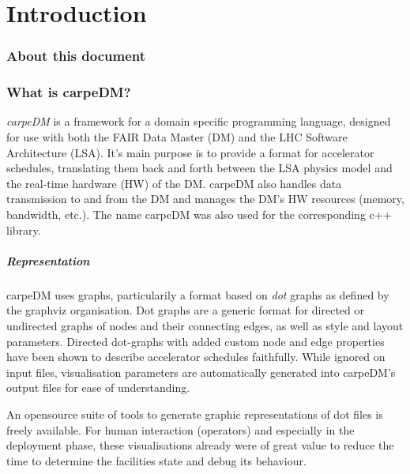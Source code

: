 

\chapter{Introduction}


\subsection{About this document}



\subsection{What is carpeDM?}

\emph{carpeDM} is a framework for a domain specific programming language, designed for use with both the FAIR Data Master (DM) and the LHC Software Architecture (LSA). It's main purpose is to provide a format for accelerator schedules, translating them back and forth between the LSA physics model and the real-time hardware (HW) of the DM. carpeDM also handles data transmission to and from the DM and manages the DM's HW resources (memory, bandwidth, etc.).
The name carpeDM was also used for the corresponding c++ library.
\paragraph{Representation}
carpeDM uses graphs, particularily a format based on \emph{dot} graphs as defined by the graphviz organisation\cite{}. Dot graphs are a generic format for directed or undirected graphs of nodes and their connecting edges,
as well as style and layout parameters. Directed dot-graphs with added custom node and edge properties have been shown to describe accelerator schedules faithfully.  While ignored on input files, visualisation parameters are automatically generated into carpeDM's output files for ease of understanding.
\par
An opensource suite of tools to generate graphic representations of dot files is freely available. For human interaction (operators) and especially in the deployment phase, these visualisations already were of great value to reduce the time to determine the facilities state and debug its behaviour.

